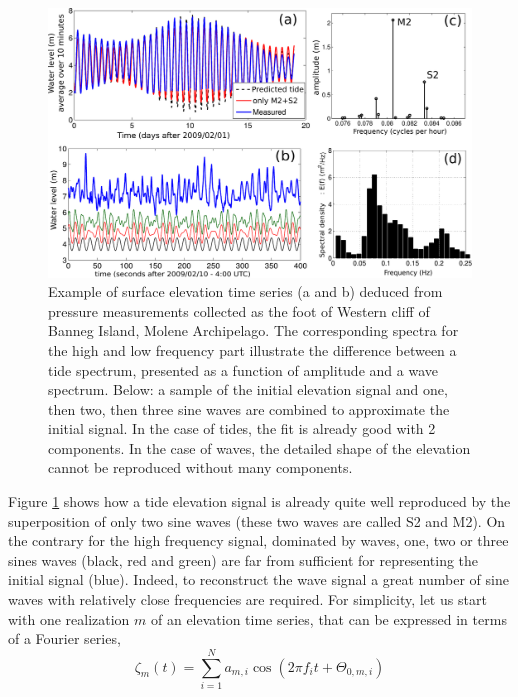 \begin{figure}[htb]
\centerline{\includegraphics[width=\textwidth]{FIGS_CH_MEASUREMENTS/spectres_maree_vagues_en.pdf}}
  \caption{
Example of  surface elevation time series (a and b) deduced from pressure measurements collected 
as the foot of Western cliff of Banneg Island, Molene Archipelago. The corresponding spectra 
for the high and low frequency part illustrate the difference between a tide spectrum, 
presented as a function of amplitude and a wave spectrum. Below: a sample of the initial 
elevation signal and one, then two, then three sine waves are combined to approximate 
the initial signal. In the case of tides, the fit is already good with 2 components. In the case of 
waves, the detailed shape of the elevation cannot be reproduced without many components.}
\label{fig:maree_vagues}
\end{figure}
Figure \ref{fig:maree_vagues} shows how a tide elevation signal is already quite well 
reproduced by the superposition of only two sine waves (these two waves are called S2 and M2). 
On the contrary for the high frequency signal, dominated by waves, one, two or three sines 
waves (black, red and green) are far from sufficient for representing the initial signal (blue). 
Indeed, to reconstruct the wave signal a great number of sine waves with relatively close 
frequencies are required. For simplicity, let us start with one realization $m$ of an elevation 
time series, that can be expressed in terms of a Fourier series,
\begin{equation}
\zeta_{m}(t)=\sum_{i=1}^{N}a_{m,i}\cos(2\pi f_{i}t+ \Theta_{0,m,i})
\label{eq3.1}
\end{equation} 
